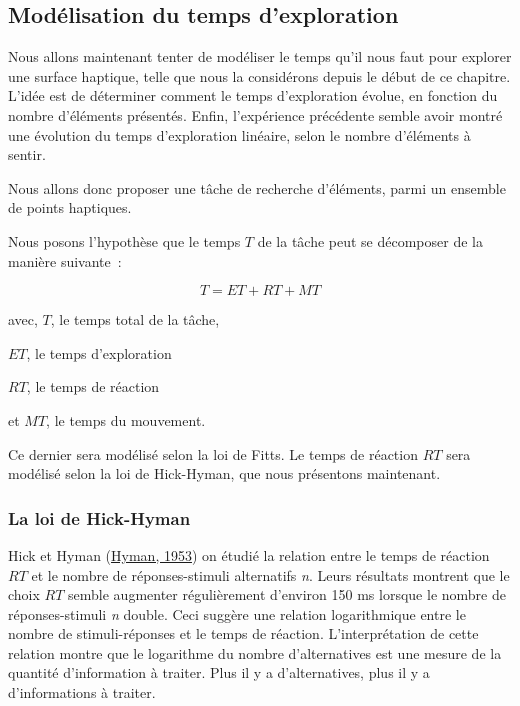 \documentclass[
]{book}
\begin{document}
\hypertarget{moduxe9lisation-du-temps-dexploration}{%
\subsection{Modélisation du temps d'exploration}\label{moduxe9lisation-du-temps-dexploration}}

Nous allons maintenant tenter de modéliser le temps qu'il nous faut pour
explorer une surface haptique, telle que nous la considérons depuis le début
de ce chapitre. L'idée est de déterminer comment le temps d'exploration
évolue, en fonction du nombre d'éléments présentés. Enfin, l'expérience
précédente semble avoir montré une évolution du temps d'exploration linéaire,
selon le nombre d'éléments à sentir.

Nous allons donc proposer une tâche de recherche d'éléments, parmi un
ensemble de points haptiques.

Nous posons l'hypothèse que le temps \(T\) de la
tâche peut se décomposer de la manière suivante~:

\begin{equation}
T=ET+RT+MT\label{eq:temps}\end{equation}

avec, \(T\), le temps total de la tâche,

\(ET\), le temps d'exploration

\(RT\), le temps de réaction

et \(MT\), le temps du mouvement.

Ce dernier sera modélisé selon la loi de Fitts. Le temps de réaction
\(RT\) sera modélisé selon la loi de Hick-Hyman, que
nous présentons maintenant.

\hypertarget{la-loi-de-hick-hyman}{%
\subsubsection{La loi de Hick-Hyman}\label{la-loi-de-hick-hyman}}

Hick et Hyman (\protect\hyperlink{ref-hyman1953stimulus}{Hyman, 1953}) on étudié
la relation entre le temps de réaction \(RT\) et le
nombre de réponses-stimuli alternatifs \emph{n}. Leurs
résultats montrent que le choix \(RT\) semble
augmenter régulièrement d'environ 150 ms lorsque le nombre de
réponses-stimuli \emph{n} double. Ceci suggère une
relation logarithmique entre le nombre de stimuli-réponses et le temps de
réaction. L'interprétation de cette relation montre que le logarithme du
nombre d'alternatives est une mesure de la quantité d'information à traiter.
Plus il y a d'alternatives, plus il y a d'informations à traiter.
\end{document}

